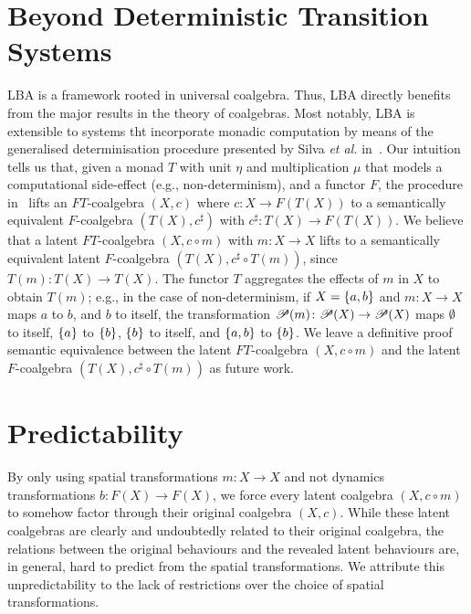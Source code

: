 \section{Beyond Deterministic Transition Systems}
LBA is a framework rooted in universal coalgebra. 
Thus, LBA directly benefits from the major results in the theory of coalgebras. Most notably, LBA is extensible to systems tht incorporate monadic computation by means of the generalised determinisation procedure presented by Silva \emph{et al.} in~\cite{GeneralisingDetermination}. 
Our intuition tells us that, given a monad $T$ with unit $\eta$ and multiplication $\mu$ that models a computational side-effect (e.g., non-determinism), and a functor $F$, the procedure in~\cite{GeneralisingDetermination} lifts an $FT$-coalgebra $(X,c)$ where $c\colon X\rightarrow F(T(X))$ to a semantically equivalent $F$-coalgebra $(T(X),c^\sharp)$ with $c^\sharp\colon T(X)\rightarrow F(T(X))$. We believe that a latent $FT$-coalgebra $(X,c\circ m)$ with $m\colon X\rightarrow X$ lifts to a semantically equivalent latent $F$-coalgebra $(T(X),c^\sharp\circ T(m))$, since $T(m)\colon T(X)\rightarrow T(X)$. 
The functor $T$ aggregates the effects of $m$ in $X$ to obtain $T(m)$; e.g., in the case of non-determinism, if $X=\left\{a,b\right\}$ and $m\colon X\rightarrow X$ maps $a$ to $b$, and $b$ to itself, the transformation ${{\mathscr{P}}\!\left({m}\right)}\colon {{\mathscr{P}}\!\left({X}\right)}\rightarrow {{\mathscr{P}}\!\left({X}\right)}$ maps $\emptyset$ to itself, $\left\{a\right\}$ to $\left\{b\right\}$, $\left\{b\right\}$ to itself, and $\left\{a,b\right\}$ to $\left\{b\right\}$. We leave a definitive proof semantic equivalence between the latent $FT$-coalgebra $(X,c\circ m)$ and the latent $F$-coalgebra $(T(X),c^\sharp\circ T(m))$ as future work. %


\section{Predictability} 
By only using spatial transformations $m\colon X\rightarrow X$ and not dynamics transformations $b\colon F(X)\rightarrow F(X)$, we force every latent coalgebra $(X,c\circ m)$ to somehow factor through their original coalgebra $(X,c)$. While these latent coalgebras are clearly and undoubtedly related to their original coalgebra, the relations between the original behaviours and the revealed latent behaviours are, in general, hard to predict from the spatial transformations. We attribute this unpredictability to the lack of restrictions over the choice of spatial transformations. 

